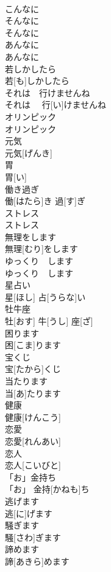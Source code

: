 \documentclass[8pt]{extreport}
\begin{document}
\begin{CJK}{UTF8}{min}
\\	こんなに	
\\	そんなに	
\\	そんなに	
\\	あんなに	
\\	あんなに	
\\	若しかしたら	
\\	若[も]しかしたら	
\\	それは　行けませんね	
\\	それは　 行[い]けませんね	
\\	オリンピック	
\\	オリンピック	
\\	元気	
\\	元気[げんき]	
\\	胃	
\\	胃[い]	
\\	働き過ぎ	
\\	働[はたら]き 過[す]ぎ	
\\	ストレス	
\\	ストレス	
\\	無理をします	
\\	無理[むり]をします	
\\	ゆっくり　します	
\\	ゆっくり　します	
\\	星占い	
\\	星[ほし] 占[うらな]い	
\\	牡牛座	
\\	牡[おす] 牛[うし] 座[ざ]	
\\	困ります	
\\	困[こま]ります	
\\	宝くじ	
\\	宝[たから]くじ	
\\	当たります	
\\	当[あ]たります	
\\	健康	
\\	健康[けんこう]	
\\	恋愛	
\\	恋愛[れんあい]	
\\	恋人	
\\	恋人[こいびと]	
\\	「お」金持ち	
\\	「お」 金持[かねも]ち	
\\	逃げます	
\\	逃[に]げます	
\\	騒ぎます	
\\	騒[さわ]ぎます	
\\	諦めます	
\\	諦[あきら]めます	

\end{CJK}
\end{document}
